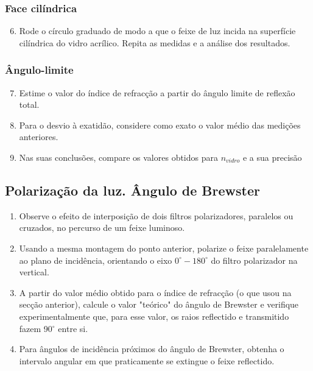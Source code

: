 \documentclass[12pt,a4paper,oneside]{paper}
\begin{document}
\subsubsection*{\sf Face cilíndrica}
\begin{enumerate}
 \setcounter{enumi}{5}
\item Rode o círculo graduado de modo a que o feixe de luz incida na  superfície cilíndrica do vidro acrílico. Repita 
as  medidas  e  a  análise  dos  resultados. 
\end{enumerate}

\subsubsection*{\sf Ângulo-limite}
\begin{enumerate}
 \setcounter{enumi}{6}
 \item Estime o valor do índice de refracção a partir do ângulo limite de reflexão total. 
\item  Para o desvio à exatidão, considere como exato o valor médio das medições anteriores. 
\item Nas suas conclusões, compare os valores obtidos  para $n_{vidro}$ e a sua precisão 

\end{enumerate}

\subsection{\sf Polarização da luz. Ângulo de Brewster}
\begin{enumerate}
\item Observe o efeito de interposição de dois filtros polarizadores, paralelos ou cruzados, no percurso de um feixe luminoso. 
\item Usando a mesma montagem do ponto anterior, polarize o feixe paralelamente ao plano
de incidência, orientando o eixo $0^\circ-180^\circ$ do filtro polarizador na vertical. 
\item A partir  do valor médio obtido para o índice de refracção (o que usou na secção anterior), calcule o valor "teórico"
do ângulo de Brewster e verifique experimentalmente que, para esse valor, os raios reflectido e transmitido fazem 90$^\circ$ entre si. 
\item Para ângulos de incidência próximos do ângulo de Brewster, obtenha o  intervalo angular em que praticamente  se extingue
o feixe reflectido. 
\end{enumerate}
\end{document}
